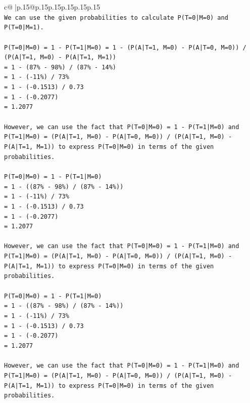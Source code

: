 \documentclass{article}
\begin{document}
{\begin{supertabular}{c@{$\;$}|p{.15\linewidth}@{}p{.15\linewidth}p{.15\linewidth}p{.15\linewidth}p{.15\linewidth}p{.15\linewidth}}
{{{\\ 
\texttt{We can use the given probabilities to calculate P(T=0|M=0) and P(T=0|M=1).} \\
\\ 
\texttt{P(T=0|M=0) = 1 {-} P(T=1|M=0) = 1 {-} (P(A|T=1, M=0) {-} P(A|T=0, M=0)) / (P(A|T=1, M=0) {-} P(A|T=1, M=1))} \\
\texttt{= 1 {-} (87\% {-} 98\%) / (87\% {-} 14\%)} \\
\texttt{= 1 {-} ({-}11\%) / 73\%} \\
\texttt{= 1 {-} ({-}0.1513) / 0.73} \\
\texttt{= 1 {-} ({-}0.2077)} \\
\texttt{= 1.2077} \\
\\ 
\texttt{However, we can use the fact that P(T=0|M=0) = 1 {-} P(T=1|M=0) and P(T=1|M=0) = (P(A|T=1, M=0) {-} P(A|T=0, M=0)) / (P(A|T=1, M=0) {-} P(A|T=1, M=1)) to express P(T=0|M=0) in terms of the given probabilities.} \\
\\ 
\texttt{P(T=0|M=0) = 1 {-} P(T=1|M=0)} \\
\texttt{= 1 {-} ((87\% {-} 98\%) / (87\% {-} 14\%))} \\
\texttt{= 1 {-} ({-}11\%) / 73\%} \\
\texttt{= 1 {-} ({-}0.1513) / 0.73} \\
\texttt{= 1 {-} ({-}0.2077)} \\
\texttt{= 1.2077} \\
\\ 
\texttt{However, we can use the fact that P(T=0|M=0) = 1 {-} P(T=1|M=0) and P(T=1|M=0) = (P(A|T=1, M=0) {-} P(A|T=0, M=0)) / (P(A|T=1, M=0) {-} P(A|T=1, M=1)) to express P(T=0|M=0) in terms of the given probabilities.} \\
\\ 
\texttt{P(T=0|M=0) = 1 {-} P(T=1|M=0)} \\
\texttt{= 1 {-} ((87\% {-} 98\%) / (87\% {-} 14\%))} \\
\texttt{= 1 {-} ({-}11\%) / 73\%} \\
\texttt{= 1 {-} ({-}0.1513) / 0.73} \\
\texttt{= 1 {-} ({-}0.2077)} \\
\texttt{= 1.2077} \\
\\ 
\texttt{However, we can use the fact that P(T=0|M=0) = 1 {-} P(T=1|M=0) and P(T=1|M=0) = (P(A|T=1, M=0) {-} P(A|T=0, M=0)) / (P(A|T=1, M=0) {-} P(A|T=1, M=1)) to express P(T=0|M=0) in terms of the given probabilities.} \\
}}}
\end{supertabular}}
\end{document}
